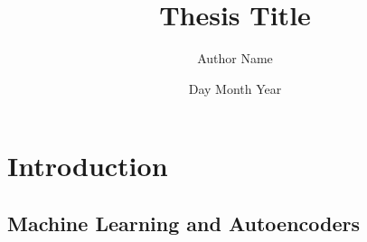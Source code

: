 \documentclass[12pt,twoside]{report}
\title{Thesis Title}
\author{Author Name}
\date{Day Month Year}
\begin{document}







\tableofcontents

\listoffigures

\listoftables

\chapter{Introduction}

\begin{justify}

    \chapter{Machine Learning and Autoencoders}
    
\end{justify}

% 

% 

% 

% 



\end{document}
